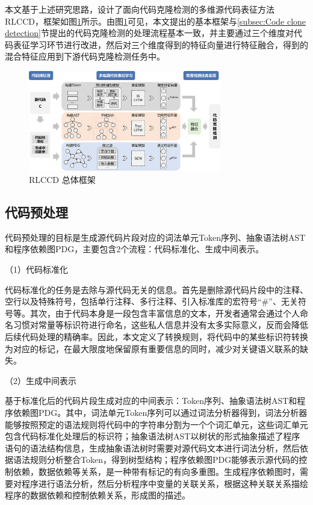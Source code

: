 本文基于上述研究思路，设计了面向代码克隆检测的多维源代码表征方法RLCCD，框架如图\ref{fig:framework}所示。由图\ref{fig:framework}可见，本文提出的基本框架与\ref{subsec:Code clone detection}节提出的代码克隆检测的处理流程基本一致，并主要通过三个维度对代码表征学习环节进行改进，然后对三个维度得到的特征向量进行特征融合，得到的混合特征应用到下游代码克隆检测任务中。

\begin{figure}[htp]
    \centering
    \includegraphics[width=0.75\textwidth]{figures/framework}
    \caption{RLCCD 总体框架}
    \label{fig:framework}
\end{figure}

\subsection{代码预处理}
\label{subsec:Preprocess}
代码预处理的目标是生成源代码片段对应的词法单元Token序列、抽象语法树AST和程序依赖图PDG，主要包含2个流程：代码标准化、生成中间表示。

（1）代码标准化

代码标准化的任务是去除与源代码无关的信息。首先是删除源代码片段中的注释、空行以及特殊符号，包括单行注释、多行注释、引入标准库的宏符号“\#”、无关符号等。其次，由于代码本身是一段包含丰富信息的文本，开发者通常会通过个人命名习惯对常量等标识符进行命名，这些私人信息并没有太多实际意义，反而会降低后续代码处理的精确率。因此，本文定义了转换规则，将代码中的某些标识符转换为对应的标记，在最大限度地保留原有重要信息的同时，减少对关键语义联系的缺失。

（2）生成中间表示

基于标准化后的代码片段生成对应的中间表示：Token序列、抽象语法树AST和程序依赖图PDG。其中，词法单元Token序列可以通过词法分析器得到，词法分析器能够按照预定的语法规则将代码中的字符串分割为一个个词汇单元，这些词汇单元包含代码标准化处理后的标识符；抽象语法树AST以树状的形式抽象描述了程序语句的语法结构信息，生成抽象语法树时需要对源代码文本进行词法分析，然后依据语法规则分析整合Token，得到树型结构；程序依赖图PDG能够表示源代码的控制依赖，数据依赖等关系，是一种带有标记的有向多重图。生成程序依赖图时，需要对程序进行语法分析，然后分析程序中变量的关联关系，根据这种关联关系描绘程序的数据依赖和控制依赖关系，形成图的描述。

